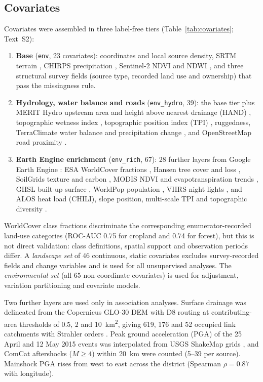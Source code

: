 \documentclass[preprint,12pt,authoryear]{elsarticle}
\newcommand{\auc}{ROC-AUC}
\begin{document}
\subsection{Covariates}
Covariates were assembled in three label-free tiers (Table~\ref{tab:covariates}; Text~S2):
\begin{enumerate}
  \item \textbf{Base} (\texttt{env}, 23 covariates): coordinates and local source density, SRTM terrain \citep{farr2007shuttle}, CHIRPS precipitation \citep{funk2015climate}, Sentinel-2 NDVI and NDWI \citep{drusch2012sentinel}, and three structural survey fields (source type, recorded land use and ownership) that pass the missingness rule.
  \item \textbf{Hydrology, water balance and roads} (\texttt{env\_hydro}, 39): the base tier plus MERIT Hydro upstream area and height above nearest drainage (HAND) \citep{yamazaki2019merit}, topographic wetness index \citep{beven1979physically}, topographic position index (TPI) \citep{dereu2013application}, ruggedness, TerraClimate water balance and precipitation change \citep{abatzoglou2018terraclimate}, and OpenStreetMap road proximity \citep{osm2024}.
  \item \textbf{Earth Engine enrichment} (\texttt{env\_rich}, 67): 28 further layers from Google Earth Engine \citep{gorelick2017google}: ESA WorldCover fractions \citep{zanaga2022worldcover}, Hansen tree cover and loss \citep{hansen2013high}, SoilGrids texture and carbon \citep{poggio2021soilgrids}, MODIS NDVI and evapotranspiration trends \citep{didan2021mod13q1, running2021mod16}, GHSL built-up surface \citep{pesaresi2023ghsl}, WorldPop population \citep{worldpop2018}, VIIRS night lights \citep{elvidge2021annual}, and ALOS heat load (CHILI), slope position, multi-scale TPI and topographic diversity \citep{theobald2015ecologically}.
\end{enumerate}
WorldCover class fractions discriminate the corresponding enumerator-recorded land-use categories (\auc{} 0.75 for cropland and 0.74 for forest), but this is not direct validation: class definitions, spatial support and observation periods differ. A \emph{landscape set} of 46 continuous, static covariates excludes survey-recorded fields and change variables and is used for all unsupervised analyses. The \emph{environmental set} (all 65 non-coordinate covariates) is used for adjustment, variation partitioning and covariate models.

Two further layers are used only in association analyses. Surface drainage was delineated from the Copernicus GLO-30 DEM \citep{esa2021copernicusdem} with D8 routing \citep{ocallaghan1984extraction} at contributing-area thresholds of 0.5, 2 and \SI{10}{\kilo\metre\squared}, giving 619, 176 and 52 occupied link catchments with Strahler orders \citep{strahler1957quantitative}. Peak ground acceleration (PGA) of the 25 April and 12 May 2015 events was interpolated from USGS ShakeMap grids \citep{wald1999trinet, worden2012probabilistic, usgs2015shakemap}, and ComCat aftershocks ($M \geq 4$) within \SI{20}{\kilo\metre} were counted (5--39 per source). Mainshock PGA rises from west to east across the district (Spearman $\rho = 0.87$ with longitude).
\end{document}
